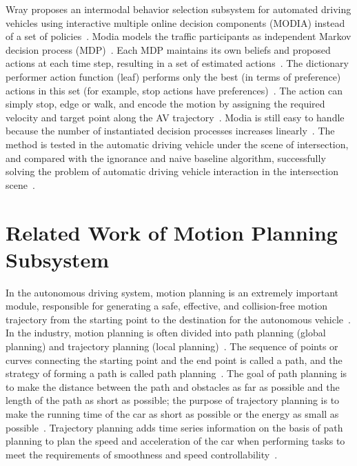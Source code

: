 \documentclass[conference]{IEEEtran}
\begin{document}
Wray proposes an intermodal behavior selection subsystem for automated driving vehicles using interactive multiple online decision components (MODIA) instead of a set of policies~\cite{ijcai2017-664}. Modia models the traffic participants as independent Markov decision process (MDP)~\cite{ijcai2017-664}. Each MDP maintains its own beliefs and proposed actions at each time step, resulting in a set of estimated actions~\cite{ijcai2017-664}. The dictionary performer action function (leaf) performs only the best (in terms of preference) actions in this set (for example, stop actions have preferences)~\cite{ijcai2017-664}. The action can simply stop, edge or walk, and encode the motion by assigning the required velocity and target point along the AV trajectory~\cite{ijcai2017-664}. Modia is still easy to handle because the number of instantiated decision processes increases linearly~\cite{ijcai2017-664}. The method is tested in the automatic driving vehicle under the scene of intersection, and compared with the ignorance and naive baseline algorithm, successfully solving the problem of automatic driving vehicle interaction in the intersection scene~\cite{ijcai2017-664}.

\section{Related Work of Motion Planning Subsystem}\label{sec:motion_planner}
In the autonomous driving system, motion planning is an extremely important module, responsible for generating a safe, effective, and collision-free motion trajectory from the starting point to the destination for the autonomous vehicle~\cite{gonzalez2015review}. In the industry, motion planning is often divided into path planning (global planning) and trajectory planning (local planning)~\cite{gonzalez2015review}. The sequence of points or curves connecting the starting point and the end point is called a path, and the strategy of forming a path is called path planning~\cite{gonzalez2015review}. The goal of path planning is to make the distance between the path and obstacles as far as possible and the length of the path as short as possible; the purpose of trajectory planning is to make the running time of the car as short as possible or the energy as small as possible~\cite{gonzalez2015review}. Trajectory planning adds time series information on the basis of path planning to plan the speed and acceleration of the car when performing tasks to meet the requirements of smoothness and speed controllability~\cite{gonzalez2015review}.
\end{document}
